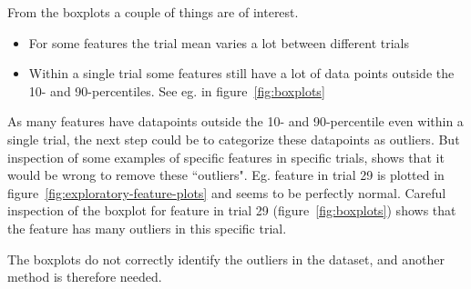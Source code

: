 From the boxplots a couple of things are of interest.
\begin{itemize}
    \item For some features the trial mean varies a lot between different trials 
    \item Within a single trial some features still have a lot of data points outside the 10- and 90-percentiles. See eg.  in figure~\ref{fig:boxplots}
\end{itemize}
As many features have datapoints outside the 10- and 90-percentile even within a single trial, the next step could be to categorize these datapoints as outliers. But inspection of some examples of specific features in specific trials, shows that it would be wrong to remove these ``outliers". Eg. feature  in trial 29 is plotted in figure~\ref{fig:exploratory-feature-plots} and seems to be perfectly normal. Careful inspection of the boxplot for feature  in trial 29 (figure~\ref{fig:boxplots}) shows that the feature has many outliers in this specific trial. \par
The boxplots do not correctly identify the outliers in the dataset, and another method is therefore needed.

